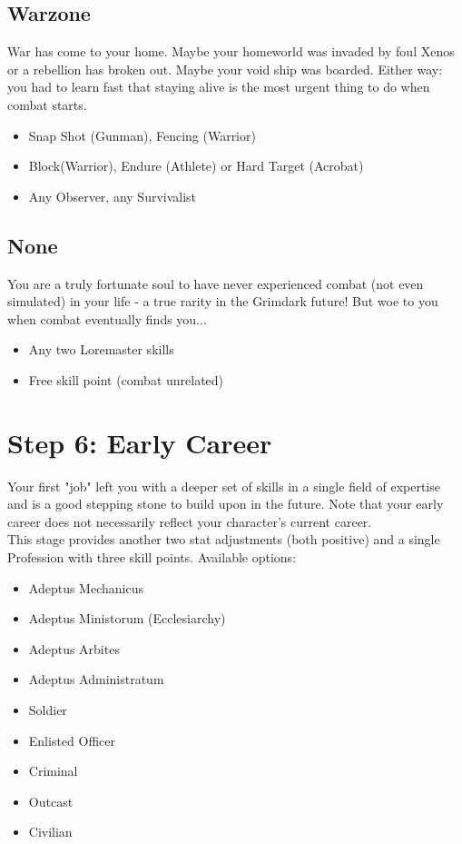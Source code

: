 \subsection{Warzone}
War has come to your home. Maybe your homeworld was invaded by foul Xenos or a rebellion has broken out. Maybe your void ship was boarded. Either way: you had to learn fast that staying alive is the most urgent thing to do when combat starts.
\begin{itemize}
	\item Snap Shot (Gunman), Fencing (Warrior)
	\item Block(Warrior), Endure (Athlete) or Hard Target (Acrobat)
	\item Any Observer, any Survivalist
\end{itemize}

\subsection{None}
You are a truly fortunate soul to have never experienced combat (not even simulated) in your life - a true rarity in the Grimdark future! But woe to you when combat eventually finds you...
\begin{itemize}
	\item Any two Loremaster skills
	\item Free skill point (combat unrelated)
\end{itemize}

\section{Step 6: Early Career} %
\label{sec:lifepath_6_early_career}
Your first "job" left you with a deeper set of skills in a single field of expertise and is a good stepping stone to build upon in the future. Note that your early career does not necessarily reflect your character's current career.\\
This stage provides another two stat adjustments (both positive) and a single Profession with three skill points.
Available options:
\begin{itemize}
	\item Adeptus Mechanicus
	\item Adeptus Ministorum (Ecclesiarchy)
	\item Adeptus Arbites
	\item Adeptus Administratum
	\item Soldier
	\item Enlisted Officer
	\item Criminal
	\item Outcast
	\item Civilian
\end{itemize}

